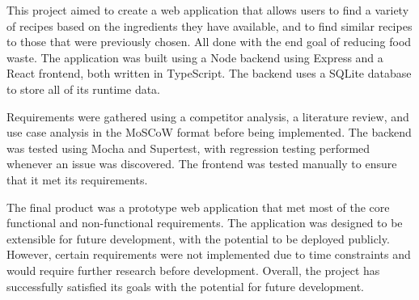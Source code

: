 This project aimed to create a web application that allows users to find a variety of recipes based on the ingredients they have
available, and to find similar recipes to those that were previously chosen. All done with the end goal of reducing food waste.
The application was built using a Node backend using Express and a React frontend, both written in TypeScript. The backend uses
a SQLite database to store all of its runtime data.

Requirements were gathered using a competitor analysis, a literature review, and use case analysis in the MoSCoW format before
being implemented. The backend was tested using Mocha and Supertest, with regression testing performed whenever an issue was
discovered. The frontend was tested manually to ensure that it met its requirements.

The final product was a prototype web application that met most of the core functional and non-functional requirements. The
application was designed to be extensible for future development, with the potential to be deployed publicly. However, certain
requirements were not implemented due to time constraints and would require further research before development. Overall, the
project has successfully satisfied its goals with the potential for future development.
